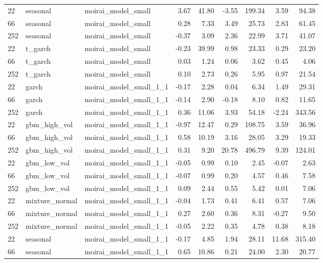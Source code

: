 {\begin{tabular}{lllrrrrrr}
\midrule
22 & seasonal & moirai\_model\_small & 3.67 & 41.80 & -3.55 & 199.34 & 3.59 & 94.38 \\
66 & seasonal & moirai\_model\_small & 0.28 & 7.33 & 3.49 & 25.73 & 2.83 & 61.45 \\
252 & seasonal & moirai\_model\_small & -0.37 & 3.09 & 2.36 & 22.99 & 3.71 & 41.07 \\
\midrule
22 & t\_garch & moirai\_model\_small & -0.23 & 39.99 & 0.98 & 23.33 & 0.29 & 23.20 \\
66 & t\_garch & moirai\_model\_small & 0.03 & 1.24 & 0.06 & 3.62 & 0.45 & 4.06 \\
252 & t\_garch & moirai\_model\_small & 0.10 & 2.73 & 0.26 & 5.95 & 0.97 & 21.54 \\
\midrule
22 & garch & moirai\_model\_small\_1\_1 & -0.17 & 2.28 & 0.04 & 6.34 & 1.49 & 29.31 \\
66 & garch & moirai\_model\_small\_1\_1 & -0.14 & 2.90 & -0.18 & 8.10 & 0.82 & 11.65 \\
252 & garch & moirai\_model\_small\_1\_1 & 0.36 & 11.06 & 3.93 & 54.18 & -2.24 & 343.56 \\
\midrule
22 & gbm\_high\_vol & moirai\_model\_small\_1\_1 & -0.97 & 12.47 & 0.29 & 108.75 & 3.59 & 36.96 \\
66 & gbm\_high\_vol & moirai\_model\_small\_1\_1 & 0.58 & 10.19 & 3.16 & 28.05 & 3.29 & 19.33 \\
252 & gbm\_high\_vol & moirai\_model\_small\_1\_1 & 0.31 & 9.20 & 20.78 & 496.79 & 9.39 & 124.01 \\
\midrule
22 & gbm\_low\_vol & moirai\_model\_small\_1\_1 & -0.05 & 0.99 & 0.10 & 2.45 & -0.07 & 2.63 \\
66 & gbm\_low\_vol & moirai\_model\_small\_1\_1 & -0.07 & 0.99 & 0.20 & 4.57 & 0.46 & 7.58 \\
252 & gbm\_low\_vol & moirai\_model\_small\_1\_1 & 0.09 & 2.44 & 0.55 & 5.42 & 0.01 & 7.06 \\
\midrule
22 & mixture\_normal & moirai\_model\_small\_1\_1 & -0.04 & 1.73 & 0.41 & 6.41 & 0.57 & 7.06 \\
66 & mixture\_normal & moirai\_model\_small\_1\_1 & 0.27 & 2.60 & 0.36 & 8.31 & -0.27 & 9.50 \\
252 & mixture\_normal & moirai\_model\_small\_1\_1 & -0.05 & 2.22 & 0.35 & 4.78 & 0.38 & 8.18 \\
\midrule
22 & seasonal & moirai\_model\_small\_1\_1 & -0.17 & 4.85 & 1.94 & 28.11 & 11.68 & 315.40 \\
66 & seasonal & moirai\_model\_small\_1\_1 & 0.65 & 10.86 & 0.21 & 24.00 & 2.30 & 20.77 \\

\end{tabular}}
